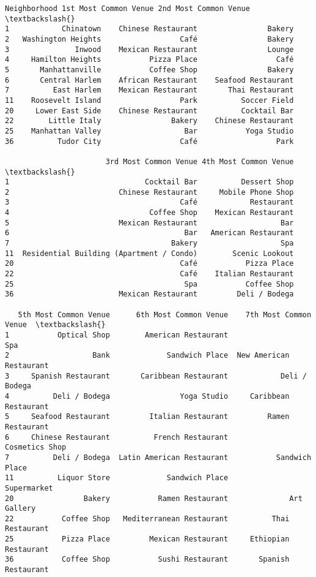 \documentclass[11pt]{article}
\makeatletter
\newcommand{\boxspacing}{\kern\kvtcb@left@rule\kern\kvtcb@boxsep}
\newcommand{\prompt}[4]{
        \ttfamily\llap{{\color{#2}[#3]:\hspace{3pt}#4}}\vspace{-\baselineskip}
    }
\makeatother
\begin{document}
            \begin{tcolorbox}[breakable, size=fbox, boxrule=.5pt, pad at break*=1mm, opacityfill=0]
\prompt{Out}{outcolor}{71}{\boxspacing}
\begin{Verbatim}[commandchars=\\\{\}]
          Neighborhood 1st Most Common Venue 2nd Most Common Venue  \textbackslash{}
1            Chinatown    Chinese Restaurant                Bakery
2   Washington Heights                  Café                Bakery
3               Inwood    Mexican Restaurant                Lounge
4     Hamilton Heights           Pizza Place                  Café
5       Manhattanville           Coffee Shop                Bakery
6       Central Harlem    African Restaurant    Seafood Restaurant
7          East Harlem    Mexican Restaurant       Thai Restaurant
11    Roosevelt Island                  Park          Soccer Field
20     Lower East Side    Chinese Restaurant          Cocktail Bar
22        Little Italy                Bakery    Chinese Restaurant
25    Manhattan Valley                   Bar           Yoga Studio
36          Tudor City                  Café                  Park

                       3rd Most Common Venue 4th Most Common Venue  \textbackslash{}
1                               Cocktail Bar          Dessert Shop
2                         Chinese Restaurant     Mobile Phone Shop
3                                       Café            Restaurant
4                                Coffee Shop    Mexican Restaurant
5                         Mexican Restaurant                   Bar
6                                        Bar   American Restaurant
7                                     Bakery                   Spa
11  Residential Building (Apartment / Condo)        Scenic Lookout
20                                      Café           Pizza Place
22                                      Café    Italian Restaurant
25                                       Spa           Coffee Shop
36                        Mexican Restaurant         Deli / Bodega

   5th Most Common Venue      6th Most Common Venue    7th Most Common Venue  \textbackslash{}
1           Optical Shop        American Restaurant                      Spa
2                   Bank             Sandwich Place  New American Restaurant
3     Spanish Restaurant       Caribbean Restaurant            Deli / Bodega
4          Deli / Bodega                Yoga Studio     Caribbean Restaurant
5     Seafood Restaurant         Italian Restaurant         Ramen Restaurant
6     Chinese Restaurant          French Restaurant           Cosmetics Shop
7          Deli / Bodega  Latin American Restaurant           Sandwich Place
11          Liquor Store             Sandwich Place              Supermarket
20                Bakery           Ramen Restaurant              Art Gallery
22           Coffee Shop   Mediterranean Restaurant          Thai Restaurant
25           Pizza Place         Mexican Restaurant     Ethiopian Restaurant
36           Coffee Shop           Sushi Restaurant       Spanish Restaurant


\end{Verbatim}
\end{tcolorbox}
\end{document}
